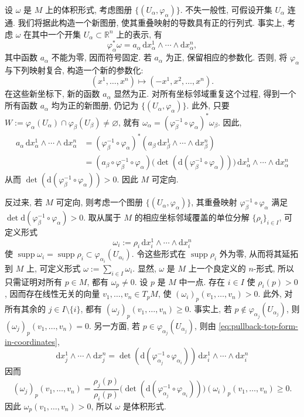 \begin{RiemannProof}
设 $\omega$ 是 $M$ 上的体积形式, 考虑图册 $\{(U_\alpha,\varphi_\alpha)\}$. 不失一般性, 可假设开集 $U_\alpha$ 连通. 我们将据此构造一个新图册, 使其重叠映射的导数具有正的行列式. 事实上, 考虑 $\omega$ 在其中一个开集 $U_\alpha\subset\mathbb{R}^n$ 上的表示, 有
\[
  \varphi_\alpha^*\omega=a_\alpha\,\mathrm{d}x_\alpha^1\wedge\cdots\wedge\mathrm{d}x_\alpha^n,
\]
其中函数 $a_\alpha$ 不能为零, 因而符号固定. 若 $a_\alpha$ 为正, 保留相应的参数化. 否则, 将 $\varphi_\alpha$ 与下列映射复合, 构造一个新的参数化:
\[
  (x^1,\ldots,x^n)\mapsto(-x^1,x^2,\ldots,x^n).
\]
在这些新坐标下, 新的函数 $a_\alpha$ 显然为正. 对所有坐标邻域重复这个过程, 得到一个所有函数 $a_\alpha$ 均为正的新图册, 仍记为 $\{(U_\alpha,\varphi_\alpha)\}$. 此外, 只要 $W:=\varphi_\alpha(U_\alpha)\cap\varphi_\beta(U_\beta)\ne\varnothing$, 就有 $\omega_\alpha=(\varphi_\beta^{-1}\circ\varphi_\alpha)^*\omega_\beta$. 因此,
\begin{align*}
  a_\alpha\,\mathrm{d}x_\alpha^1\wedge\cdots\wedge\mathrm{d}x_\alpha^n
  &=(\varphi_\beta^{-1}\circ\varphi_\alpha)^*
    (a_\beta\,\mathrm{d}x_\beta^1\wedge\cdots\wedge\mathrm{d}x_\beta^n)\\
  &=(a_\beta\circ\varphi_\beta^{-1}\circ\varphi_\alpha)
    \bigl(\det(\mathrm{d}(\varphi_\beta^{-1}\circ\varphi_\alpha))\bigr)
    \,\mathrm{d}x_\alpha^1\wedge\cdots\wedge\mathrm{d}x_\alpha^n
\end{align*}
从而 $\det(\mathrm{d}(\varphi_\beta^{-1}\circ\varphi_\alpha))>0$. 因此 $M$ 可定向.

反过来, 若 $M$ 可定向, 则考虑一个图册 $\{(U_\alpha,\varphi_\alpha)\}$, 其重叠映射 $\varphi_\beta^{-1}\circ\varphi_\alpha$ 满足 $\det\mathrm{d}(\varphi_\beta^{-1}\circ\varphi_\alpha)>0$. 取从属于 $M$ 的相应坐标邻域覆盖的单位分解 $\{\rho_i\}_{i\in I}$, 可定义形式
\[
  \omega_i:=\rho_i\,\mathrm{d}x_i^1\wedge\cdots\wedge\mathrm{d}x_i^n
\]
使 $\operatorname{supp}\omega_i=\operatorname{supp}\rho_i\subset\varphi_{\alpha_i}(U_{\alpha_i})$. 令这些形式在 $\operatorname{supp}\rho_i$ 外为零, 从而将其延拓到 $M$ 上, 可定义形式 $\omega:=\sum_{i\in I}\omega_i$. 显然, $\omega$ 是 $M$ 上一个良定义的 $n$-形式, 所以只需证明对所有 $p\in M$, 都有 $\omega_p\ne0$. 设 $p$ 是 $M$ 中一点. 存在 $i\in I$ 使 $\rho_i(p)>0$, 因而存在线性无关的向量 $v_1,\ldots,v_n\in T_pM$, 使 $(\omega_i)_p(v_1,\ldots,v_n)>0$. 此外, 对所有其余的 $j\in I\setminus\{i\}$, 都有 $(\omega_j)_p(v_1,\ldots,v_n)\geq0$. 事实上, 若 $p\notin\varphi_{\alpha_j}(U_{\alpha_j})$, 则 $(\omega_j)_p(v_1,\ldots,v_n)=0$. 另一方面, 若 $p\in\varphi_{\alpha_j}(U_{\alpha_j})$, 则由 \eqref{eq:pullback-top-form-in-coordinates},
\[
  \mathrm{d}x_j^1\wedge\cdots\wedge\mathrm{d}x_j^n
  =\det(\mathrm{d}(\varphi_{\alpha_j}^{-1}\circ\varphi_{\alpha_i}))
    \,\mathrm{d}x_i^1\wedge\cdots\wedge\mathrm{d}x_i^n
\]
因而
\[
  (\omega_j)_p(v_1,\ldots,v_n)
  =\frac{\rho_j(p)}{\rho_i(p)}
    \bigl(\det(\mathrm{d}(\varphi_{\alpha_j}^{-1}\circ\varphi_{\alpha_i}))\bigr)
    (\omega_i)_p(v_1,\ldots,v_n)\geq0.
\]
因此 $\omega_p(v_1,\ldots,v_n)>0$, 所以 $\omega$ 是体积形式.
\end{RiemannProof}

